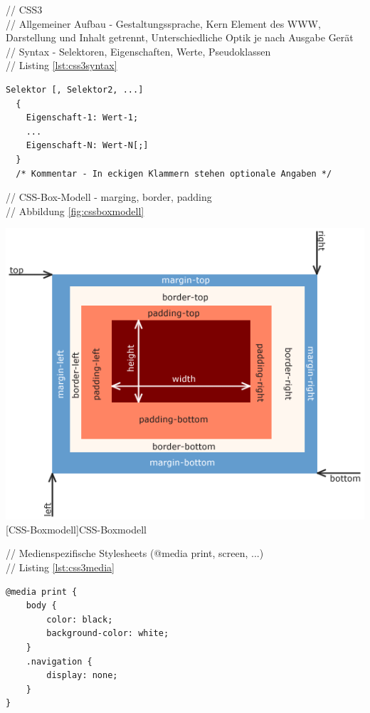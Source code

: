 \documentclass[12pt,a4paper,bibliography=totocnumbered,listof=totocnumbered]{scrartcl}
\begin{document}
// CSS3\\
// Allgemeiner Aufbau - Gestaltungssprache, Kern Element des WWW, Darstellung und Inhalt getrennt, Unterschiedliche Optik je nach Ausgabe Gerät\\
// Syntax - Selektoren, Eigenschaften, Werte, Pseudoklassen\\
// Listing \ref{lst:css3syntax}
	\vspace{1em}
	\begin{lstlisting}[caption=CSS3 Syntax Beispiel, label=lst:css3syntax]
Selektor [, Selektor2, ...]
  {
    Eigenschaft-1: Wert-1;
    ...
    Eigenschaft-N: Wert-N[;]
  }
  /* Kommentar - In eckigen Klammern stehen optionale Angaben */
	\end{lstlisting}

// CSS-Box-Modell - marging, border, padding\\
// Abbildung \ref{fig:cssboxmodell}\\
	\vspace{1em}
	\begin{minipage}{\linewidth}
		\centering
		\includegraphics[width=0.7\linewidth]{images/css_boxmodell.png}
		[CSS-Boxmodell]{CSS-Boxmodell\footnotemark }
		\label{fig:cssboxmodell}
	\end{minipage}
	
// Medienspezifische Stylesheets (@media print, screen, ...)\\
// Listing \ref{lst:css3media}
	\vspace{1em}
	\begin{lstlisting}[caption=CSS3 medienspezifisches Stylesheet, label=lst:css3media]
@media print {
	body {
		color: black;
		background-color: white;
	}
	.navigation {
		display: none;
	}
}
	\end{lstlisting}
\end{document}
